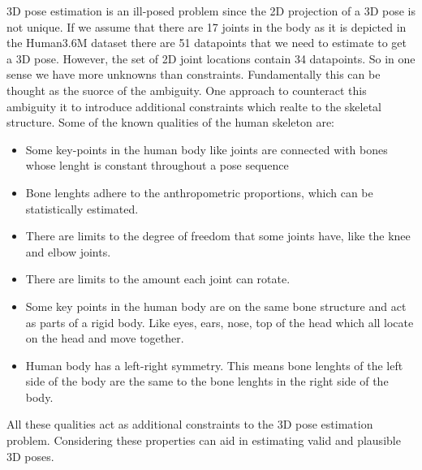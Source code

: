 3D pose estimation is an ill-posed problem since the 2D projection of a 3D pose is not unique. If we assume that there are 17 joints in the body as it is depicted in the Human3.6M dataset \parencite{ionescu2014human3} there are 51 datapoints that we need to estimate to get a 3D pose. However, the set of 2D joint locations contain 34 datapoints. So in one sense we have more unknowns than constraints. Fundamentally this can be thought as the suorce of the ambiguity. One approach to counteract this ambiguity it to introduce additional constraints which realte to the skeletal structure. Some of the known qualities of the human skeleton are:
\begin{itemize}
    \item Some key-points in the human body like joints are connected with bones whose lenght is constant throughout a pose sequence
    \item Bone lenghts adhere to the anthropometric proportions, which can be statistically estimated.
    \item There are limits to the degree of freedom that some joints have, like the knee and elbow joints.
    \item There are limits to the amount each joint can rotate.
    \item Some key points in the human body are on the same bone structure and act as parts of a rigid body. Like eyes, ears, nose, top of the head which all locate on the head and move together.
    \item Human body has a left-right symmetry. This means bone lenghts of the left side of the body are the same to the bone lenghts in the right side of the body.
\end{itemize}

All these qualities act as additional constraints to the 3D pose estimation problem. Considering these properties can aid in estimating valid and plausible 3D poses.

